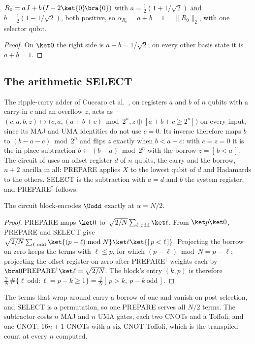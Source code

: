 \begin{lemma}
$R_0=a\,I+b\,(I-2\ket{0}\!\bra{0})$ with $a=\tfrac12(1+1/\sqrt2)$ and $b=\tfrac12(1-1/\sqrt2)$, both positive, so $\alpha_{R_0}=a+b=1=\|R_0\|_2$, with one selector qubit.
\end{lemma}
\begin{proof}
On $\ket0$ the right side is $a-b=1/\sqrt2$; on every other basis state it is $a+b=1$.
\end{proof}

\subsection{The arithmetic SELECT}
\label{app:uodd-select-detail}

The ripple-carry adder of Cuccaro et al.\ \cite{cuccaro2004adder}, on registers $a$ and $b$ of $n$ qubits with a carry-in $c$ and an overflow $z$, acts as $(c,a,b,z)\mapsto\bigl(c,a,(a+b+c)\bmod2^n,z\oplus[a+b+c\ge2^n]\bigr)$ on every input, since its MAJ and UMA identities do not use $c=0$. Its inverse therefore maps $b$ to $(b-a-c)\bmod2^n$ and flips $z$ exactly when $b<a+c$: with $c=z=0$ it is the in-place subtraction $b\leftarrow(b-a)\bmod2^n$ with the borrow $z=[\,b<a\,]$. The circuit of  uses an offset register $d$ of $n$ qubits, the carry and the borrow, $n+2$ ancilla in all: PREPARE applies $X$ to the lowest qubit of $d$ and Hadamards to the others, SELECT is the subtraction with $a=d$ and $b$ the system register, and PREPARE$^\dagger$ follows.

\begin{lemma}
\label{lem:uodd-select}
The circuit block-encodes $\Uodd$ exactly at $\alpha=N/2$.
\end{lemma}
\begin{proof}
PREPARE maps $\ket0$ to $\sqrt{2/N}\sum_{\ell\ \text{odd}}\ket\ell$. From $\ket p\ket0$, PREPARE and SELECT give $\sqrt{2/N}\sum_{\ell\ \text{odd}}\ket{(p-\ell)\bmod N}\ket\ell\ket{[\,p<\ell\,]}$. Projecting the borrow on zero keeps the terms with $\ell\le p$, for which $(p-\ell)\bmod N=p-\ell$; projecting the offset register on zero after PREPARE$^\dagger$ weights each by $\bra0\mathrm{PREPARE}^\dagger\ket\ell=\sqrt{2/N}$. The block's entry $(k,p)$ is therefore $\tfrac2N\,\#\{\ell\ \text{odd}:\ell=p-k\ge1\}=\tfrac2N[\,p>k,\ p-k\ \text{odd}\,]$.
\end{proof}

The terms that wrap around carry a borrow of one and vanish on post-selection, and SELECT is a permutation, so one PREPARE serves all $N/2$ terms. The subtractor costs $n$ MAJ and $n$ UMA gates, each two CNOTs and a Toffoli, and one CNOT: $16n+1$ CNOTs with a six-CNOT Toffoli, which is the transpiled count at every $n$ computed.

